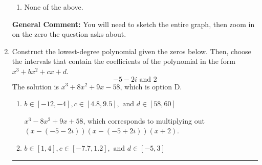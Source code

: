 \documentclass{extbook}[14pt]
\newcommand{\litem}[1]{\item #1

\rule{\textwidth}{0.4pt}}
\begin{document}
\begin{enumerate}
{\begin{enumerate}[label=\Alph*.]
\item None of the above.\end{enumerate}
\textbf{General Comment:} You will need to sketch the entire graph, then zoom in on the zero the question asks about.
}
\litem{
Construct the lowest-degree polynomial given the zeros below. Then, choose the intervals that contain the coefficients of the polynomial in the form $x^3+bx^2+cx+d$.
\[ -5 - 2 i \text{ and } 2 \]The solution is \( x^{3} +8 x^{2} +9 x -58 \), which is option D.\begin{enumerate}[label=\Alph*.]
\item \( b \in [-12, -4], c \in [4.8, 9.5], \text{ and } d \in [58, 60] \)

$x^{3} -8 x^{2} +9 x + 58$, which corresponds to multiplying out $(x-(-5 - 2 i))(x-(-5 + 2 i))(x + 2)$.
\item \( b \in [1, 4], c \in [-7.7, 1.2], \text{ and } d \in [-5, 3] \)


\end{enumerate}}
\end{enumerate}
\end{document}

